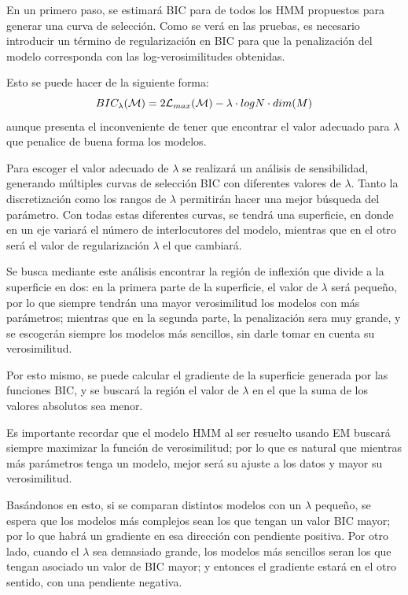 En un primero paso, se estimará \ac{BIC} para de todos los \ac{HMM} propuestos para generar una curva de selección. Como se verá en las pruebas, es necesario introducir un término de regularización en \ac{BIC} para que la penalización del modelo corresponda con las log-verosimilitudes obtenidas. 

Esto se puede hacer de la siguiente forma: 
\begin{equation}
BIC_{\lambda}(\mathcal{M}) = 2 \mathcal{L}_{max}(\mathcal{M}) - \lambda \cdot log N \cdot dim(M)
\end{equation}
aunque presenta el inconveniente de tener que encontrar el valor adecuado para $\lambda$ que penalice de buena forma los modelos. 

Para escoger el valor adecuado de $\lambda$ se realizará un análisis de sensibilidad, generando múltiples curvas de selección \ac{BIC} con diferentes valores de $\lambda$. Tanto la discretización como los rangos de $\lambda$ permitirán hacer una mejor búsqueda del parámetro. Con todas estas diferentes curvas, se tendrá una superficie, en donde en un eje variará el número de interlocutores del modelo, mientras que en el otro será el valor de regularización $\lambda$ el que cambiará. 

Se busca mediante este análisis encontrar la región de inflexión que divide a la superficie en dos: en la primera parte de la superficie, el valor de $\lambda$ será pequeño, por lo que siempre tendrán una mayor verosimilitud los modelos con más parámetros; mientras que en la segunda parte, la penalización sera muy grande, y se escogerán siempre los modelos más sencillos, sin darle tomar en cuenta su verosimilitud.

Por esto mismo, se puede calcular el gradiente de la superficie generada por las funciones \ac{BIC}, y se buscará la región el valor de $\lambda$ en el que la suma de los valores absolutos sea menor. 

Es importante recordar que el modelo \ac{HMM} al ser resuelto usando \ac{EM} buscará siempre maximizar la función de verosimilitud; por lo que es natural que mientras más parámetros tenga un modelo, mejor será su ajuste a los datos y mayor su verosimilitud.

Basándonos en esto, si se comparan distintos modelos con un $\lambda$ pequeño, se espera que los modelos más complejos sean los que tengan un valor \ac{BIC} mayor; por lo que habrá un gradiente en esa dirección con pendiente positiva. Por otro lado, cuando el $\lambda$ sea demasiado grande, los modelos más sencillos seran los que tengan asociado un valor de \ac{BIC} mayor; y entonces el gradiente estará en el otro sentido, con una pendiente negativa. 

